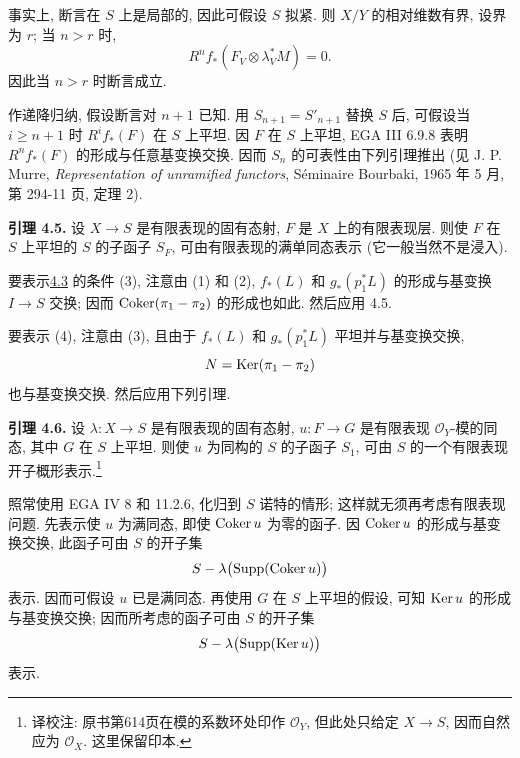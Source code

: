 事实上, 断言在 \(S\) 上是局部的, 因此可假设 \(S\) 拟紧. 则 \(X/Y\) 的相对维数有界, 设界为 \(r\); 当 \(n>r\) 时,
\[
  R^nf_*(F_V\otimes\lambda_V^*M)=0.
\]
因此当 \(n>r\) 时断言成立.

作递降归纳, 假设断言对 \(n+1\) 已知. 用 \(S_{n+1}=S'_{n+1}\) 替换 \(S\) 后, 可假设当 \(i\geq n+1\) 时 \(R^if_*(F)\) 在 \(S\) 上平坦. 因 \(F\) 在 \(S\) 上平坦, EGA III 6.9.8 表明 \(R^nf_*(F)\) 的形成与任意基变换交换. 因而 \(S_n\) 的可表性由下列引理推出 (见 J. P. Murre, \emph{Representation of unramified functors}, S\'eminaire Bourbaki, 1965 年 5 月, 第 294-11 页, 定理 2).

\textbf{引理 4.5.} 设 \(X\to S\) 是有限表现的固有态射, \(F\) 是 \(X\) 上的有限表现层. 则使 \(F\) 在 \(S\) 上平坦的 \(S\) 的子函子 \(S_F\), 可由有限表现的满单同态表示 (它一般当然不是浸入).

要表示\hyperlink{sga6.e12.lem.4-3}{4.3} 的条件 (3), 注意由 (1) 和 (2), \(f_*(L)\) 和 \(g_*(p_1^*L)\) 的形成与基变换 \(I\to S\) 交换; 因而 \(\operatorname{Coker}(\pi_1-\pi_2)\) 的形成也如此. 然后应用 4.5.

要表示 (4), 注意由 (3), 且由于 \(f_*(L)\) 和 \(g_*(p_1^*L)\) 平坦并与基变换交换,
\[
  N=\operatorname{Ker}(\pi_1-\pi_2)
\]
也与基变换交换. 然后应用下列引理.

\textbf{引理 4.6.} 设 \(\lambda:X\to S\) 是有限表现的固有态射, \(u:F\to G\) 是有限表现 \(\mathcal O_Y\)-模的同态, 其中 \(G\) 在 \(S\) 上平坦. 则使 \(u\) 为同构的 \(S\) 的子函子 \(S_1\), 可由 \(S\) 的一个有限表现开子概形表示.\footnote{译校注: 原书第614页在模的系数环处印作 $\mathcal O_Y$, 但此处只给定 $X\to S$, 因而自然应为 $\mathcal O_X$. 这里保留印本.}

照常使用 EGA IV 8 和 11.2.6, 化归到 \(S\) 诺特的情形; 这样就无须再考虑有限表现问题. 先表示使 \(u\) 为满同态, 即使 \(\operatorname{Coker} u\) 为零的函子. 因 \(\operatorname{Coker} u\) 的形成与基变换交换, 此函子可由 \(S\) 的开子集
\[
  S-\lambda\bigl(\operatorname{Supp}(\operatorname{Coker} u)\bigr)
\]
表示. 因而可假设 \(u\) 已是满同态. 再使用 \(G\) 在 \(S\) 上平坦的假设, 可知 \(\operatorname{Ker} u\) 的形成与基变换交换; 因而所考虑的函子可由 \(S\) 的开子集
\[
  S-\lambda\bigl(\operatorname{Supp}(\operatorname{Ker} u)\bigr)
\]
表示.
